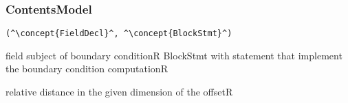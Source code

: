 \subsubsection*{ContentsModel}{}

\begin{lstlisting}[style=default,frame=none]
(^\concept{FieldDecl}^, ^\concept{BlockStmt}^)
\end{lstlisting}

\begin{HIRChildElements}
	{field subject of boundary condition}{R}
	{BlockStmt with statement that implement the boundary condition computation}{R}
\end{HIRChildElements}

\begin{HIRAttributes}
	{relative distance in the given dimension of the offset}{R}
\end{HIRAttributes}
